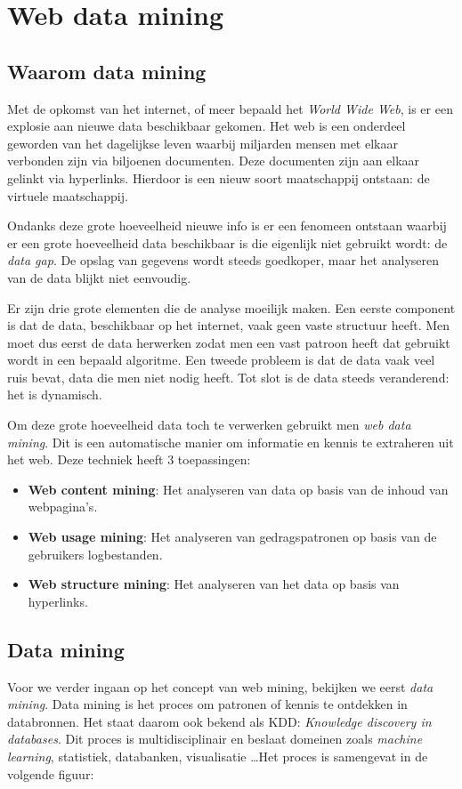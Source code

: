 \chapter{Web data mining}
\section{Waarom data mining}
Met de opkomst van het internet, of meer bepaald het \emph{World Wide Web}, is er een explosie aan nieuwe data beschikbaar gekomen. Het web is een onderdeel geworden van het dagelijkse leven waarbij miljarden mensen met elkaar verbonden zijn via biljoenen documenten. Deze documenten zijn aan elkaar gelinkt via hyperlinks. Hierdoor is een nieuw soort maatschappij ontstaan: de virtuele maatschappij. 

Ondanks deze grote hoeveelheid nieuwe info is er een fenomeen ontstaan waarbij er een grote hoeveelheid data beschikbaar is die eigenlijk niet gebruikt wordt: de \emph{data gap}. De opslag van gegevens wordt steeds goedkoper, maar het analyseren van de data blijkt niet eenvoudig.

Er zijn drie grote elementen die de analyse moeilijk maken. Een eerste component is dat de data, beschikbaar op het internet, vaak geen vaste structuur heeft. Men moet dus eerst de data herwerken zodat men een vast patroon heeft dat gebruikt wordt in een bepaald algoritme.
Een tweede probleem is dat de data vaak veel ruis bevat, data die men niet nodig heeft. 
Tot slot is de data steeds veranderend: het is dynamisch.

Om deze grote hoeveelheid data toch te verwerken gebruikt men \emph{web data mining}. Dit is een automatische manier om informatie en kennis te extraheren uit het web. Deze techniek heeft 3 toepassingen: 
\begin{itemize}
  \item \textbf{Web content mining}: Het analyseren van data op basis van de inhoud van webpagina's.
  \item \textbf{Web usage mining}: Het analyseren van gedragspatronen op basis van de gebruikers logbestanden.
  \item \textbf{Web structure mining}: Het analyseren van het data op basis van hyperlinks.
\end{itemize}
\section{Data mining}
Voor we verder ingaan op het concept van web mining, bekijken we eerst \emph{data mining}. Data mining is het proces om patronen of kennis te ontdekken in databronnen. Het staat daarom ook bekend als KDD: \emph{Knowledge discovery in databases}. Dit proces is multidisciplinair en beslaat domeinen zoals \emph{machine learning}, statistiek, databanken, visualisatie \dots  Het proces is samengevat in de volgende figuur:

